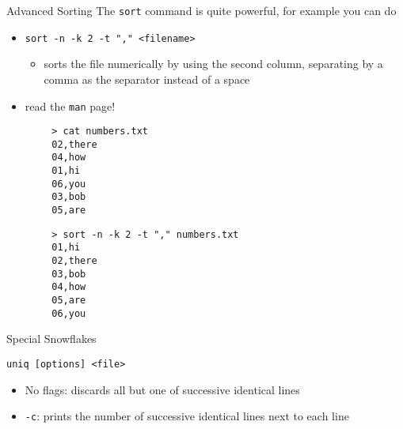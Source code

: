 \begin{frame}[fragile]{Advanced Sorting}
  The \texttt{sort} command is quite powerful, for example you can do
  \begin{itemize}
    \item \texttt{sort -n -k 2 -t "," <filename>}
    \begin{itemize}
      \item sorts the file numerically by using the second column, separating by a comma as the separator instead
            of a space
    \end{itemize}
    \item read the \texttt{man} page!
  \end{itemize}
  \vspace*{-2ex}
  \begin{minipage}[t]{\textwidth}
    \begin{minipage}[t]{.48\textwidth}
      \begin{verbatim}
        > cat numbers.txt
        02,there
        04,how
        01,hi
        06,you
        03,bob
        05,are
      \end{verbatim}
    \end{minipage}
    \hfill
    \begin{minipage}[t]{.48\textwidth}
      \begin{verbatim}
        > sort -n -k 2 -t "," numbers.txt
        01,hi
        02,there
        03,bob
        04,how
        05,are
        06,you
      \end{verbatim}
    \end{minipage}
  \end{minipage}
\end{frame}

\begin{frame}[fragile]{Special Snowflakes}
  \begin{block}{}
    \texttt{uniq [options] <file>}
    \begin{itemize}
      \item No flags: discards all but one of successive identical lines
      \item \texttt{-c}: prints the number of successive identical lines next to each line
    \end{itemize}
  \end{block}
\end{frame}

